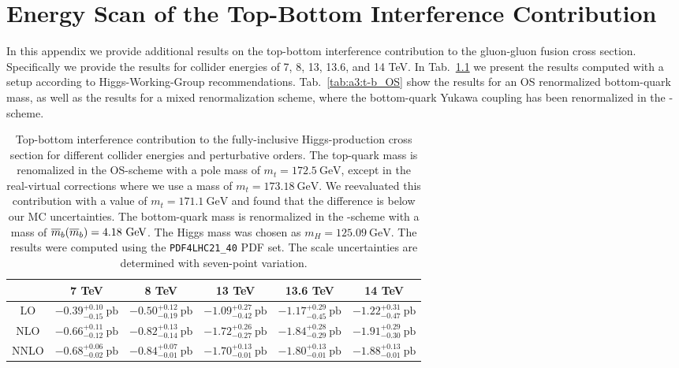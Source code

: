 

\chapter{Energy Scan of the Top-Bottom Interference Contribution}\label{app:3}

In this appendix we provide additional results on the top-bottom interference contribution to the gluon-gluon fusion cross section. Specifically we provide the results for collider energies of 7, 8, 13, 13.6, and 14 TeV. In Tab.~\ref{tab:a3:t-b_MS} we present the results computed with a setup according to Higgs-Working-Group recommendations. Tab.~\ref{tab:a3:t-b_OS} show the results for an \acs{OS} renormalized bottom-quark mass, as well as the results for a mixed renormalization scheme, where the bottom-quark Yukawa coupling has been renormalized in the \MS-scheme.

\begin{table}[ht]
\centering
\begin{tabular}{cccccc}
& 7 TeV  & 8 TeV & 13 TeV & 13.6 TeV & 14 TeV  \\
\hline
LO & $-0.39^{+0.10}_{-0.15} \ \text{pb}$ & $-0.50^{+0.12}_{-0.19} \ \text{pb}$ & $-1.09^{+0.27}_{-0.42} \ \text{pb}$ & $-1.17^{+0.29}_{-0.45} \ \text{pb}$ & $-1.22^{+0.31}_{-0.47} \ \text{pb}$  \\
NLO & $-0.66^{+0.11}_{-0.12} \ \text{pb}$ & $-0.82^{+0.13}_{-0.14} \ \text{pb}$ & $-1.72^{+0.26}_{-0.27} \ \text{pb}$ & $-1.84^{+0.28}_{-0.29} \ \text{pb}$ & $-1.91^{+0.29}_{-0.30} \ \text{pb}$ \\
NNLO & $-0.68^{+0.06}_{-0.02} \ \text{pb}$ & $-0.84^{+0.07}_{-0.01} \ \text{pb}$ & $-1.70^{+0.13}_{-0.01} \ \text{pb}$ & $-1.80^{+0.13}_{-0.01} \ \text{pb}$ & $-1.88^{+0.13}_{-0.01} \ \text{pb}$ \\
\end{tabular}
\caption{Top-bottom interference contribution to the fully-inclusive Higgs-production cross section for different collider energies and perturbative orders. The top-quark mass is renomalized in the \acs{OS}-scheme with a pole mass of $m_t = 172.5\ \mathrm{GeV}$, except in the real-virtual corrections where we use a mass of $m_t = 173.18\ \mathrm{GeV}$. We reevaluated this contribution with a value of $m_t = 171.1\ \mathrm{GeV}$ and found that the difference is below our \acs{MC} uncertainties. The bottom-quark mass is renormalized in the \MS-scheme with a mass of $\overline{m}_{b}\!\left(\overline{m}_{b} \right) = 4.18\ \mathrm{GeV}$. The Higgs mass was chosen as $m_H = 125.09 \ \mathrm{GeV}$. The results were computed using the \texttt{PDF4LHC21\_40} \acs{PDF} set. The scale uncertainties are determined with seven-point variation.}
\label{tab:a3:t-b_MS}
\end{table}

